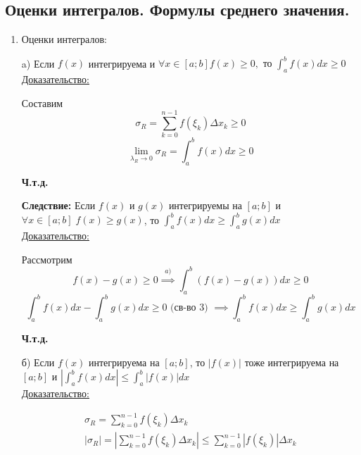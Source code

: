 \documentclass[12pt]{article}
\begin{document}
    \subsection{Оценки интегралов. Формулы среднего значения.}
    \begin{enumerate}
        \item Оценки интегралов:\\
        \begin{adjustwidth}{1.5em}{1.5em}
            a) Если $f(x)$ интегрируема и $\forall x \in [a;b] f(x)\geq 0,\text{ то } \int_{a}^{b} f(x)dx \geq 0$\\
            \underline{Доказательство:}
            \begin{adjustwidth}{1.5em}{1.5em}
                Составим 
                \[ \sigma_R=\sum_{k=0}^{n-1} f(\xi_k)\Delta x_k \geq 0 \]
                \[ \lim_{\lambda_R \to 0}\sigma_R=\int_{a}^{b}f(x)dx\geq 0 \]
                \begin{center}
                    \textbf{Ч.т.д.}
                \end{center}
            \end{adjustwidth}
            \textbf{Следствие:} Если $f(x)$ и $g(x)$ интегрируемы на $[a;b]$ и $\forall x \in [a;b]\; f(x)\geq g(x)$, то $\int_{a}^{b}f(x)dx \geq \int_{a}^{b} g(x)dx$\\
            \underline{Доказательство:}
            \begin{adjustwidth}{1.5em}{1.5em}
                Рассмотрим 
                \[ f(x)-g(x)\geq 0 \overset{a)}{\implies} \int_{a}^{b} (f(x)-g(x))dx \geq 0 \]
                \[ \int_{a}^{b} f(x)dx-\int_{a}^{b}g(x)dx\geq 0 \text{ (св-во 3) } \implies \int_{a}^{b}f(x)dx\geq\int_{a}^{b}g(x)dx\]
                \begin{center}
                    \textbf{Ч.т.д.}
                \end{center}
            \end{adjustwidth}
            б) Если $f(x)$ интегрируема на $[a;b]$, то $\left|f(x)\right|$ тоже интегрируема на $[a;b]$ и $\left|\int_{a}^{b}f(x)dx\right|\leq \int_{a}^{b}\left|f(x)\right| dx$\\
            \underline{Доказательство:}
            \begin{adjustwidth}{1.5em}{1.5em}
                \begin{gather*}
                    \sigma_R=\sum_{k=0}^{n-1} f(\xi_k)\Delta x_k\\
                    |\sigma_R|=\left|\sum_{k=0}^{n-1} f(\xi_k)\Delta x_k\right| \leq \sum_{k=0}^{n-1}|f(\xi_k)|\Delta x_k

\end{gather*}
\end{adjustwidth}
\end{adjustwidth}
\end{enumerate}
\end{document}
